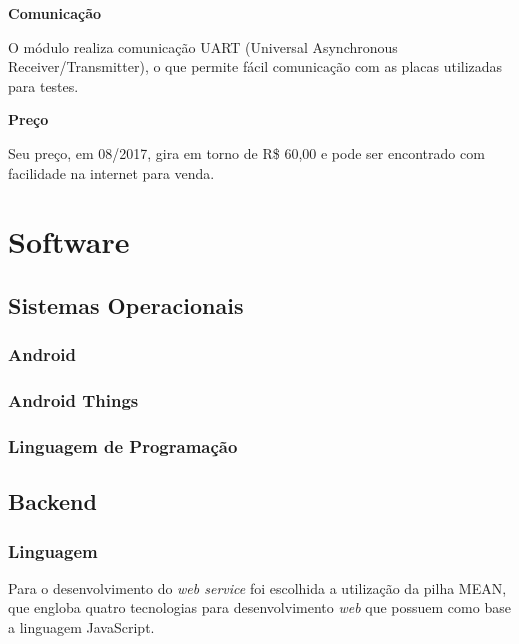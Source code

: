 \documentclass[
	12pt,				%
	oneside,			%
	a4paper,			%
	brazil				%
]{abntex2}
\begin{document}
\textbf{Comunicação}

O módulo realiza comunicação UART (Universal Asynchronous Receiver/Transmitter), o que permite fácil comunicação com as placas utilizadas para testes.

\textbf{Preço}

Seu preço, em 08/2017, gira em torno de R\$ 60,00 e pode ser encontrado com facilidade na internet para venda. 

\section{Software}

\subsection{Sistemas Operacionais}

\subsubsection{Android}

\subsubsection{Android Things}

\subsubsection{Linguagem de Programação}

\subsection{Backend}

\subsubsection{Linguagem}

Para o desenvolvimento do \textit{web service} foi escolhida a utilização da pilha MEAN, que engloba quatro tecnologias para desenvolvimento \textit{web} que possuem como base a linguagem JavaScript.

\end{document}
